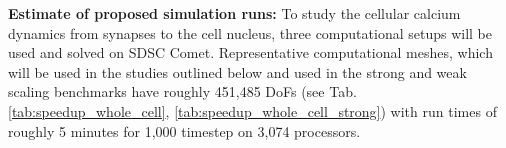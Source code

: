 %
\noindent \textbf{Estimate of proposed simulation runs:} 
To study the cellular calcium dynamics from synapses to the cell nucleus, three computational setups will be used and solved on SDSC Comet. Representative computational meshes, which will be used in the
studies outlined below and used in the strong and weak scaling benchmarks have roughly 451,485 DoFs (see Tab. \ref{tab:speedup_whole_cell}, \ref{tab:speedup_whole_cell_strong}) with run times of roughly 5 minutes for 1,000 timestep on 3,074 processors.


